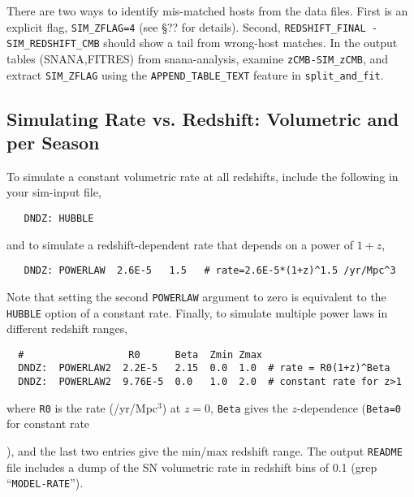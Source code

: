 \documentclass[12pt]{article}
\begin{document}
{\medskip
There are two ways to identify mis-matched hosts from the data files.
First is an explicit flag, {\tt SIM\_ZFLAG=4} 
(see \S?? for details).
Second, {\tt REDSHIFT\_FINAL - SIM\_REDSHIFT\_CMB} should 
show a tail from wrong-host matches.
In the output tables (SNANA,FITRES) from snana-analysis,
examine {\tt zCMB-SIM\_zCMB}, and extract {\tt SIM\_ZFLAG}
using the {\tt APPEND\_TABLE\_TEXT} feature in {\tt split\_and\_fit}.

   \clearpage
 \subsection{Simulating Rate vs. Redshift: Volumetric and per Season}
 \label{subsec:DNDZ}

To simulate a constant volumetric rate at all redshifts,
include the following in your sim-input file,
%
\begin{verbatim}
   DNDZ: HUBBLE
\end{verbatim}
%
and to simulate a redshift-dependent rate that depends
on a power of $1+z$,
%
\begin{verbatim}
   DNDZ: POWERLAW  2.6E-5   1.5   # rate=2.6E-5*(1+z)^1.5 /yr/Mpc^3
\end{verbatim}
%
Note that setting the second {\tt POWERLAW} argument to zero
is equivalent to the {\tt HUBBLE} option of a constant rate.
Finally, to simulate multiple power laws in different 
redshift ranges,
\begin{verbatim}
  #                  R0      Beta  Zmin Zmax
  DNDZ:  POWERLAW2  2.2E-5   2.15  0.0  1.0  # rate = R0(1+z)^Beta
  DNDZ:  POWERLAW2  9.76E-5  0.0   1.0  2.0  # constant rate for z>1
\end{verbatim}
%
where {\tt R0} is the rate (/yr/Mpc$^3$) at $z=0$,
{\tt Beta} gives the $z$-dependence ({\tt Beta=0} for constant rate}),
and the last two entries give the min/max redshift range.
The output {\tt README} file includes a dump of the 
SN volumetric rate in redshift bins of 0.1
(grep ``{\tt MODEL-RATE}'').
\end{document}
